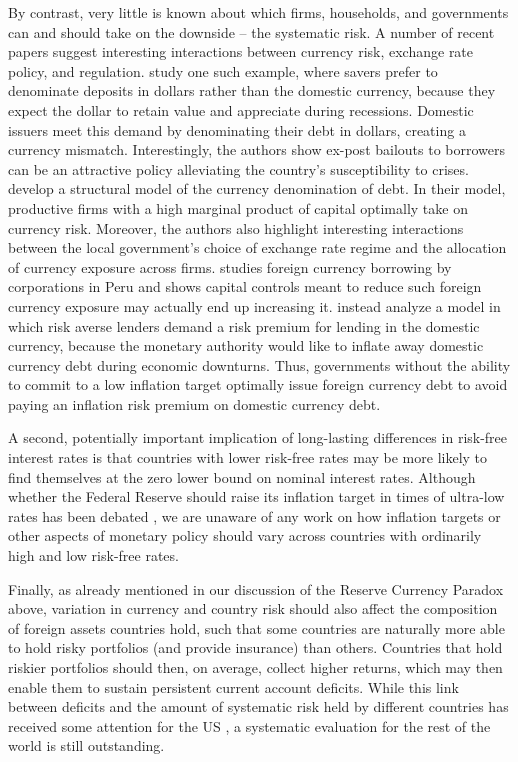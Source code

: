 \documentclass{ar-1col}
\begin{document}
By contrast, very little is known about which firms, households, and governments can and should take on the downside -- the systematic risk. A number of recent papers suggest interesting interactions between currency risk, exchange rate policy, and regulation. \citet{Bocola2019} study one such example, where savers prefer to denominate deposits in dollars rather than the domestic currency, because they expect the dollar to retain value and appreciate during recessions. Domestic issuers meet this demand by denominating their debt in dollars, creating a currency mismatch. Interestingly, the authors show ex-post bailouts to borrowers can be an attractive policy alleviating the country's susceptibility to crises. \citet{SalomaoVarela2019} develop a structural model of the currency denomination of debt. In their model, productive firms with a high marginal product of capital optimally take on currency risk. Moreover, the authors also highlight interesting interactions between the local government's choice of exchange rate regime and the allocation of currency exposure across firms. \cite{keller2019capital} studies foreign currency borrowing by corporations in Peru and shows capital controls meant to reduce such foreign currency exposure may actually end up increasing it. \citet{du2020sovereign} instead analyze a model in which risk averse lenders demand a risk premium for lending in the domestic currency, because the monetary authority would like to inflate away domestic currency debt during economic downturns. Thus, governments without the ability to commit to a low inflation target optimally issue foreign currency debt to avoid paying an inflation risk premium on domestic currency debt. 

A second, potentially important implication of long-lasting differences in risk-free interest rates is that countries with lower risk-free rates may be more likely to find themselves at the zero lower bound on nominal interest rates. Although whether the Federal Reserve should raise its inflation target in times of ultra-low rates has been debated \citep{Coibion2012, Holston2017, mertens2018expect}, we are unaware of any work on how inflation targets or other aspects of monetary policy should vary across countries with ordinarily high and low risk-free rates. 

Finally, as already mentioned in our discussion of the Reserve Currency Paradox above, variation in currency and country risk should also affect the composition of foreign assets countries hold, such that some countries are naturally more able to hold risky portfolios (and provide insurance) than others. Countries that hold riskier portfolios should then, on average, collect higher returns, which may then enable them to sustain persistent current account deficits. While this link between deficits and the amount of systematic risk held by different countries has received some attention for the US \citep{Caballeroetal2008,GourinchasRey2007,GourinchasGovillotRey2017}, a systematic evaluation for the rest of the world is still outstanding.
\end{document}
